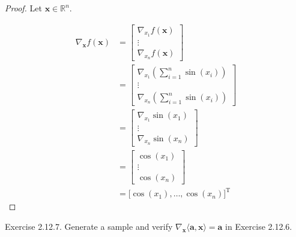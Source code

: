 \documentclass{article}
\theoremstyle{plain}
\begin{document}
\begin{proof}
	Let
	\begin{math}
		\bm{x} \in \mathbb{R}^n .
	\end{math}
	
	\begin{equation*}
		\begin{split}
			\nabla_{\bm{x}} f(\bm{x}) &=
			\begin{bmatrix}
				\nabla_{x_1} f(\bm{x}) \\
				\vdots \\
				\nabla_{x_n} f(\bm{x})
			\end{bmatrix} \\
			&=
			\begin{bmatrix}
				\nabla_{x_1} (\sum_{i=1}^n \sin(x_i)) \\
				\vdots \\
				\nabla_{x_n} (\sum_{i=1}^n \sin(x_i))
			\end{bmatrix} \\
			&=
			\begin{bmatrix}
				\nabla_{x_1} \sin(x_1) \\
				\vdots \\
				\nabla_{x_n} \sin(x_n)
			\end{bmatrix} \\
			&=
			\begin{bmatrix}
				\cos(x_1) \\
				\vdots \\
				\cos(x_n)
			\end{bmatrix} \\
			&=
			\lbrack \cos(x_1) , \ldots , \cos(x_n) \rbrack^\mathrm{T}
		\end{split}
	\end{equation*}
\end{proof}

\begin{itembox}[l]{Exercise 2.12.7.}
	Generate a sample and verify
	\begin{math}
		\nabla_{\bm{x}} \langle \bm{a} , \bm{x} \rangle = \bm{a}
	\end{math}
	in Exercise 2.12.6.
\end{itembox}
\end{document}

